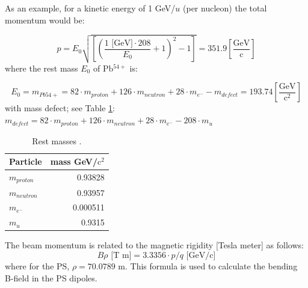 \documentclass{cernatsnote}
\begin{document}
As an example, for a kinetic energy of 1 GeV/$u$ (per nucleon) the total momentum would be:

$$p = E_{0}\sqrt{\left [ \left( \frac{1\text{ [GeV]}\cdot 208}{E_{0}}+1\right )^{2}-1\right ]} = 351.9 \left[\frac{\text{GeV}}{\text{c}}\right]$$
where the rest mass $E_{0}$ of Pb$^{54+}$ is:

$$E_{0} = m_{Pb54+}= 82\cdot m_{proton} + 126\cdot m_{neutron} + 28\cdot m_{e^{-}} - m_{defect} = 193.74 \left[\frac{\text{GeV}}{\text{c}^{2}}\right]$$
with mass defect; see Table \ref{table:masses}: $m_{defect}=82\cdot m_{proton} + 126\cdot m_{neutron} + 28\cdot m_{e^{-}} - 208\cdot m_{u}$ 

\begin{table}[h!]
\centering
\caption{Rest masses \cite{boston_university_nuclear_nodate}.}
\begin{threeparttable}
\begin{tabular}{lr}
\toprule
Particle & mass GeV/$\text{c}^{2}$\\
\midrule
$m_{proton}$ & 0.93828      \\
$m_{neutron}$ & 0.93957      \\
$m_{e^{-}}$ & 0.000511 \\
$m_{u}$ & 0.9315       \\
\bottomrule
\end{tabular}
\label{table:masses}
\end{threeparttable}
\end{table}

The beam momentum is related to the magnetic rigidity [Tesla meter] as follows: 
$$B\rho \text{ [T m]} = 3.3356\cdot p/q \text{ [GeV/c]}$$
where for the PS, $\rho = 70.0789$ m. This formula is used to calculate the bending B-field in the PS dipoles.
\\
\end{document}
